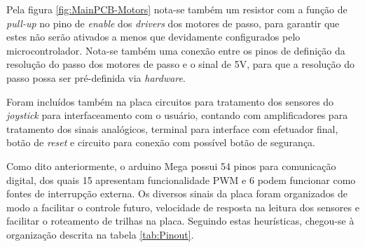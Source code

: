 Pela figura \ref{fig:MainPCB-Motors} nota-se também um resistor com a 
função de \textit{pull-up} no pino de \textit{enable} dos \textit{drivers}
dos motores de passo, para garantir que estes não serão ativados a menos que devidamente 
configurados pelo microcontrolador. Nota-se também uma conexão entre 
os pinos de definição da resolução do passo dos motores de passo e o 
sinal de 5V, para que a resolução do passo possa ser pré-definida via
\textit{hardware}.

Foram incluídos também na placa circuitos para tratamento dos sensores 
do \textit{joystick} para interfaceamento com o usuário, contando 
com amplificadores para tratamento dos sinais analógicos, terminal para
interface com efetuador final, botão de \textit{reset} e circuito para
conexão com possível botão de segurança.

Como dito anteriormente, o arduino Mega possui 54 pinos para comunicação
digital, dos quais 15 apresentam funcionalidade PWM e 6 podem funcionar
como fontes de interrupção externa. Os diversos sinais da placa foram 
organizados de modo a facilitar o controle futuro, velocidade de resposta
na leitura dos sensores e facilitar o roteamento de trilhas na placa. 
Seguindo estas heurísticas, chegou-se à organização descrita na tabela
\ref{tab:Pinout}.

